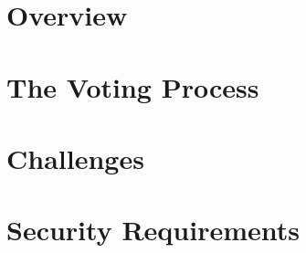 \section{Overview}



\section{The Voting Process}



\section{Challenges}



\section{Security Requirements}